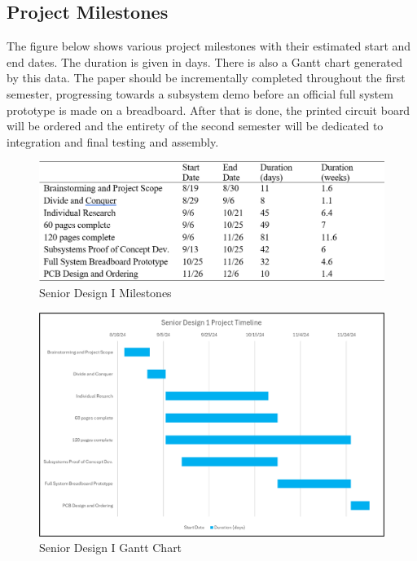 \subsection{Project Milestones}
\noindent The figure below shows various project milestones with their estimated start and end dates. The duration is given in days. There is also a Gantt chart generated by this data. The paper should be incrementally completed throughout the first semester, progressing towards a subsystem demo before an official full system prototype is made on a breadboard. After that is done, the printed circuit board will be ordered and the entirety of the second semester will be dedicated to integration and final testing and assembly. \\

\begin{figure}[H]
	\centering
	\includegraphics[width=\textwidth]{./Images/SD1mile.png}
	\caption{\label{fig:SD1mile}Senior Design I Milestones}
\end{figure}

\begin{figure}[H]
	\centering
	\includegraphics[width=\textwidth]{./Images/SD1gantt.png}
	\caption{\label{fig:SD1gantt}Senior Design I Gantt Chart}
\end{figure}


